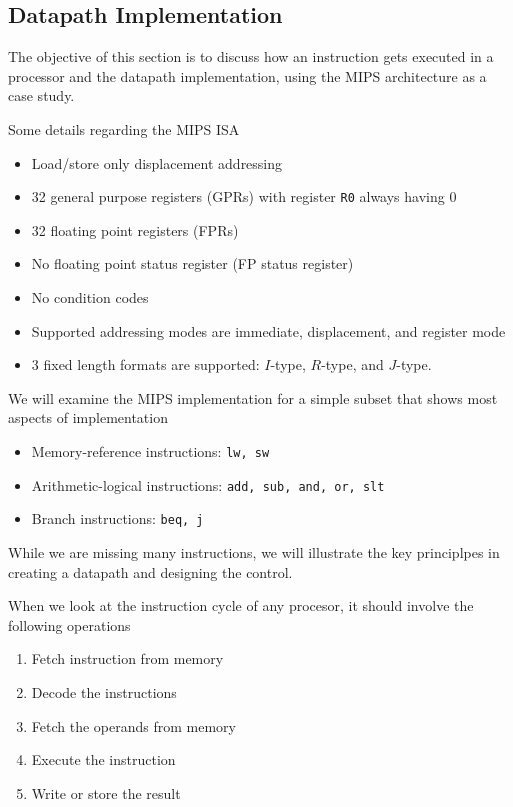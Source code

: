\documentclass[12pt]{scrartcl}
\begin{document}
\subsection{Datapath Implementation}

The objective of this section is to discuss how an instruction gets executed in a processor and the 
datapath implementation, using the MIPS architecture as a case study. 

\begin{note}
  Some details regarding the MIPS ISA
  \begin{itemize}
    \item Load/store only displacement addressing
    \item 32 general purpose registers (GPRs) with register \verb|R0| always having $0$
    \item 32 floating point registers (FPRs)
    \item No floating point status register (FP status register)
    \item No condition codes
    \item Supported addressing modes are immediate, displacement, and register mode
    \item $3$ fixed length formats are supported: $I$-type, $R$-type, and $J$-type.
  \end{itemize}
\end{note}

We will examine the MIPS implementation for a simple subset that shows most aspects of 
implementation
\begin{itemize}
  \item Memory-reference instructions: \verb|lw, sw|
  \item Arithmetic-logical instructions: \verb|add, sub, and, or, slt|
  \item Branch instructions: \verb|beq, j|
\end{itemize}
While we are missing many instructions, we will illustrate the key principlpes in creating a datapath and 
designing the control.

\begin{note}
  When we look at the instruction cycle of any procesor, it should involve the following operations
  \begin{enumerate}
    \item Fetch instruction from memory
    \item Decode the instructions
    \item Fetch the operands from memory
    \item Execute the instruction
    \item Write or store the result
  \end{enumerate}
\end{note}
\end{document}
